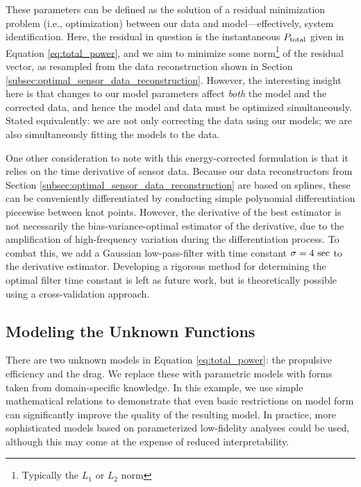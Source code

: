 These parameters can be defined as the solution of a residual minimization problem (i.e., optimization) between our data and model—effectively, system identification. Here, the residual in question is the instantaneous $P_{\rm total}$ given in Equation \ref{eq:total_power}, and we aim to minimize some norm\footnote{Typically the $L_1$ or $L_2$ norm} of the residual vector, as resampled from the data reconstruction shown in Section \ref{subsec:optimal_sensor_data_reconstruction}. However, the interesting insight here is that changes to our model parameters affect \emph{both} the model and the corrected data, and hence the model and data must be optimized simultaneously. Stated equivalently: we are not only correcting the data using our models; we are also simultaneously fitting the models to the data.

One other consideration to note with this energy-corrected formulation is that it relies on the time derivative of sensor data. Because our data reconstructors from Section \ref{subsec:optimal_sensor_data_reconstruction} are based on splines, these can be conveniently differentiated by conducting simple polynomial differentiation piecewise between knot points. However, the derivative of the best estimator is not necessarily the bias-variance-optimal estimator of the derivative, due to the amplification of high-frequency variation during the differentiation process. To combat this, we add a Gaussian low-pass-filter with time constant $\sigma=4\ \rm sec$ to the derivative estimator. Developing a rigorous method for determining the optimal filter time constant is left as future work, but is theoretically possible using a cross-validation approach.

\subsection{Modeling the Unknown Functions}
\label{subsec:modeling_unknown_functions}

There are two unknown models in Equation \ref{eq:total_power}: the propulsive efficiency and the drag. We replace these with parametric models with forms taken from domain-specific knowledge. In this example, we use simple mathematical relations to demonstrate that even basic restrictions on model form can significantly improve the quality of the resulting model. In practice, more sophisticated models based on parameterized low-fidelity analyses could be used, although this may come at the expense of reduced interpretability.

